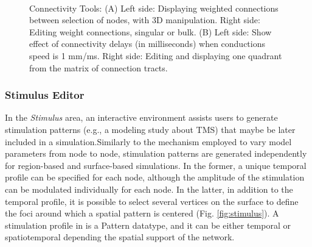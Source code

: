  \begin{figure}[!htbp]
		\centering
		\\
		\caption{Connectivity Tools: 
		(A) Left side: Displaying weighted connections between selection of nodes, with 3D manipulation.
		Right side: Editing weight connections, singular or bulk.
		(B) Left side: Show effect of connectivity delays (in milliseconds) when conductions speed is 1 mm/ms.
		Right side: Editing and displaying one quadrant from the matrix of connection tracts.}
				\label{fig:connectivity}
\end{figure}

\subsubsection{Stimulus Editor}

	In the \emph{Stimulus} area, an interactive environment assists users to
	generate stimulation patterns (e.g., a modeling study about TMS) that maybe be
	later included in a simulation.Similarly to the mechanism employed to vary
	model parameters from node to node, stimulation patterns are generated
	independently for region-based and surface-based simulations. In the former, a
	unique temporal profile can be specified for each node, although the amplitude
	of the stimulation can be modulated individually for each node. In the latter,
	in addition to the temporal profile, it is possible to select several vertices
	on the surface to define the foci around which a spatial pattern is centered
	(Fig. \ref{fig:stimulus}). A stimulation profile in \TVB is a Pattern
	datatype, and it can be either temporal or spatiotemporal depending the
	spatial support of the network.

